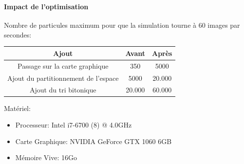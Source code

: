\begin{frame}
    \frametitle{\cclpti}
    \framesubtitle{Impact de l'optimisation}
    Nombre de particules maximum pour que la simulation tourne à 60 images par secondes:
    
    \begin{center}
        \begin{tabular}{ |c|c|c| } 
         \hline
         Ajout & Avant & Après \\ 
         \hline
         Passage sur la carte graphique & 350 & 5000 \\ 
         Ajout du partitionnement de l'espace & 5000 & 20.000 \\ 
         Ajout du tri bitonique & 20.000 & 60.000 \\
         \hline
        \end{tabular}
    \end{center}
    
    {\tiny Matériel:
    \begin{itemize}
        \item Processeur: Intel i7-6700 (8) @ 4.0GHz
        \item Carte Graphique: NVIDIA GeForce GTX 1060 6GB
        \item Mémoire Vive: 16Go
    \end{itemize}
    }
    \end{frame}
